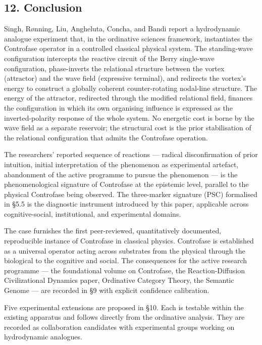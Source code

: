 \documentclass[
  11pt,
  a4paper,
]{article}
\begin{document}
\subsection{12. Conclusion}\label{conclusion}

Singh, Rønning, Liu, Angheluta, Concha, and Bandi report a hydrodynamic
analogue experiment that, in the ordinative sciences framework,
instantiates the Controfase operator in a controlled classical physical
system. The standing-wave configuration intercepts the reactive circuit
of the Berry single-wave configuration, phase-inverts the relational
structure between the vortex (attractor) and the wave field (expressive
terminal), and redirects the vortex's energy to construct a globally
coherent counter-rotating nodal-line structure. The energy of the
attractor, redirected through the modified relational field, finances
the configuration in which its own organising influence is expressed as
the inverted-polarity response of the whole system. No energetic cost is
borne by the wave field as a separate reservoir; the structural cost is
the prior stabilisation of the relational configuration that admits the
Controfase operation.

The researchers' reported sequence of reactions --- radical
disconfirmation of prior intuition, initial interpretation of the
phenomenon as experimental artefact, abandonment of the active programme
to pursue the phenomenon --- is the phenomenological signature of
Controfase at the epistemic level, parallel to the physical Controfase
being observed. The three-marker signature (PSC) formalised in §5.5 is
the diagnostic instrument introduced by this paper, applicable across
cognitive-social, institutional, and experimental domains.

The case furnishes the first peer-reviewed, quantitatively documented,
reproducible instance of Controfase in classical physics. Controfase is
established as a universal operator acting across substrates from the
physical through the biological to the cognitive and social. The
consequences for the active research programme --- the foundational
volume on Controfase, the Reaction-Diffusion Civilizational Dynamics
paper, Ordinative Category Theory, the Semantic Genome --- are recorded
in §9 with explicit confidence calibration.

Five experimental extensions are proposed in §10. Each is testable
within the existing apparatus and follows directly from the ordinative
analysis. They are recorded as collaboration candidates with
experimental groups working on hydrodynamic analogues.
\end{document}
